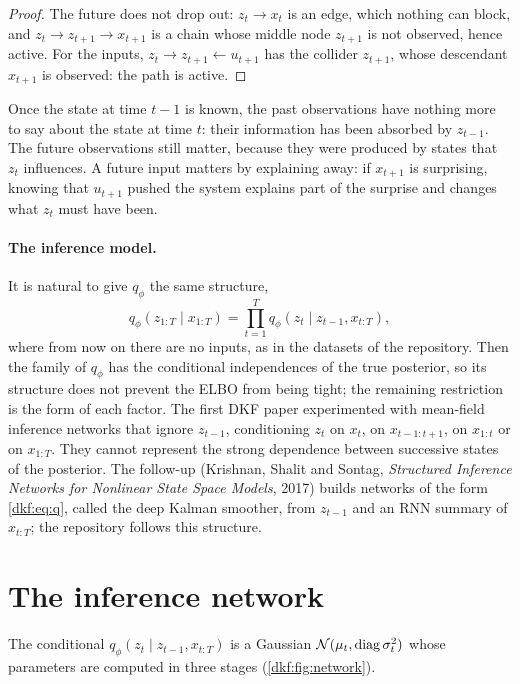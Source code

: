 \begin{notechapter}
\begin{proof}
The future does not drop out: $z_t\to x_t$ is an edge, which nothing can block, and
$z_t\to z_{t+1}\to x_{t+1}$ is a chain whose middle node $z_{t+1}$ is not observed, hence active. For the inputs,
$z_t\to z_{t+1}\leftarrow u_{t+1}$ has the collider $z_{t+1}$, whose descendant $x_{t+1}$ is observed: the path is active.
\end{proof}

\begin{intuition}
Once the state at time $t-1$ is known, the past observations have nothing more to say about
the state at time $t$: their information has been absorbed by $z_{t-1}$. The future observations still
matter, because they were produced by states that $z_t$ influences. A future input matters by
explaining away: if $x_{t+1}$ is surprising, knowing that $u_{t+1}$ pushed the system explains part of the
surprise and changes what $z_t$ must have been.
\end{intuition}

\paragraph{The inference model.} It is natural to give $q_\phi$ the same structure,
\begin{equation}\label{dkf:eq:q}
  q_\phi(z_{1:T}\mid x_{1:T}) = \prod_{t=1}^Tq_\phi(z_t\mid z_{t-1}, x_{t:T}),
\end{equation}
where from now on there are no inputs, as in the datasets of the repository. Then the
family of $q_\phi$ has the conditional independences of the true posterior, so its structure does
not prevent the ELBO from being tight; the remaining restriction is the form of each factor. The first DKF paper experimented with mean-field inference networks
that ignore $z_{t-1}$, conditioning $z_t$ on $x_t$, on $x_{t-1:t+1}$, on $x_{1:t}$ or on $x_{1:T}$. They cannot represent the strong
dependence between successive states of the posterior. The follow-up (Krishnan, Shalit and
Sontag, \emph{Structured Inference Networks for Nonlinear State Space Models}, 2017) builds
networks of the form \eqref{dkf:eq:q}, called the deep Kalman smoother, from $z_{t-1}$ and an RNN summary of
$x_{t:T}$; the repository follows this structure.

\section{The inference network}\label{dkf:sec:inference}

The conditional $q_\phi(z_t\mid z_{t-1}, x_{t:T})$ is a Gaussian $\mathcal N(\mu_t, \operatorname{diag}\sigma_t^2)$ whose parameters are computed in three
stages (\cref{dkf:fig:network}).


\end{notechapter}
